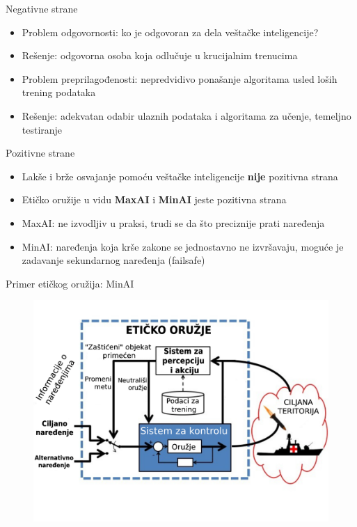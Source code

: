 \documentclass[14pt, aspectratio=169]{beamer}
\begin{document}
\begin{frame}{Negativne strane}
    \begin{itemize}
        \item<1-> Problem odgovornosti: ko je odgovoran za dela veštačke inteligencije?
        \item<2-> Rešenje: odgovorna osoba koja odlučuje u krucijalnim trenucima
        \item<3-> Problem preprilagođenosti: nepredvidivo ponašanje algoritama usled loših trening podataka
        \item<4-> Rešenje: adekvatan odabir ulaznih podataka i algoritama za učenje, temeljno testiranje
    \end{itemize}
\end{frame}

\begin{frame}{Pozitivne strane}
    \begin{itemize}
        \item<1-> Lakše i brže osvajanje pomoću veštačke inteligencije \textbf{nije} pozitivna strana
        \item<2-> Etičko oružije u vidu \textbf{MaxAI} i \textbf{MinAI} jeste pozitivna strana
        \item<3-> MaxAI: ne izvodljiv u praksi, trudi se da što preciznije prati naređenja
        \item<4-> MinAI: naređenja koja krše zakone se jednostavno ne izvršavaju, moguće je zadavanje sekundarnog naređenja (failsafe)
    \end{itemize}    
\end{frame}

\begin{frame}{Primer etičkog oružija: MinAI}
    \begin{figure}[h!]
        \begin{center}
            \includegraphics[scale=0.2]{minAI_slideovi.jpg}
        \end{center}
        \label{fig:minAI}
    \end{figure}
\end{frame}
\end{document}

